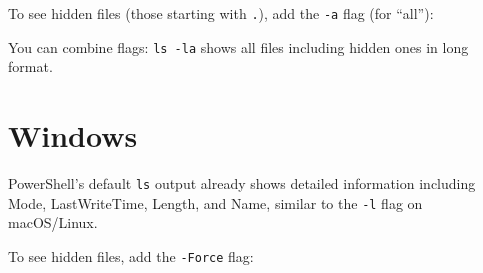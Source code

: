 \documentclass[
  letterpaper,
  DIV=11,
  numbers=noendperiod]{scrreprt}
\newenvironment{Shaded}{\begin{snugshade}}{\end{snugshade}}
\newcommand{\AttributeTok}[1]{\textcolor[rgb]{0.40,0.45,0.13}{#1}}
\newcommand{\BuiltInTok}[1]{\textcolor[rgb]{0.00,0.23,0.31}{#1}}
\newcommand{\ExtensionTok}[1]{\textcolor[rgb]{0.00,0.23,0.31}{#1}}
\newcommand{\NormalTok}[1]{\textcolor[rgb]{0.00,0.23,0.31}{#1}}
\begin{document}
To see hidden files (those starting with \texttt{.}), add the
\texttt{-a} flag (for ``all''):

\begin{codelisting}

\caption{\texttt{terminal}}

\begin{Shaded}
\end{Shaded}

\end{codelisting}

You can combine flags: \texttt{ls\ -la} shows all files including hidden
ones in long format.

\section{Windows}

PowerShell's default \texttt{ls} output already shows detailed
information including Mode, LastWriteTime, Length, and Name, similar to
the \texttt{-l} flag on macOS/Linux.

To see hidden files, add the \texttt{-Force} flag:
\end{document}
